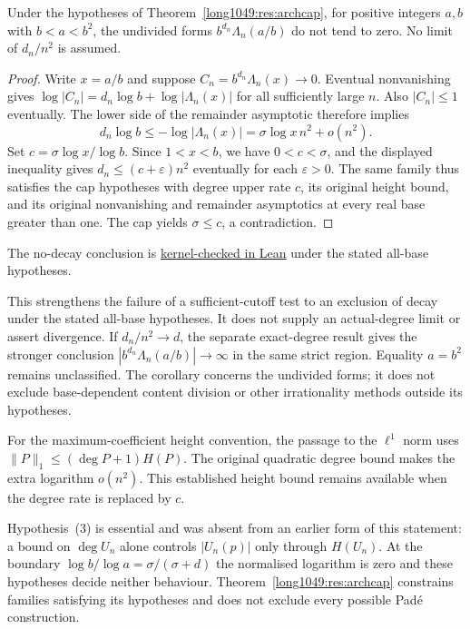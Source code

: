\begin{corollary}
\label{long1049:cor:no-decay-below-square}
Under the hypotheses of Theorem~\ref{long1049:res:archcap}, for positive integers
$a,b$ with $b<a<b^2$, the undivided forms $b^{d_n}\Lambda_n(a/b)$ do not
tend to zero.  No limit of $d_n/n^2$ is assumed.
\end{corollary}
\begin{proof}
Write $x=a/b$ and suppose $C_n=b^{d_n}\Lambda_n(x)\to0$.
Eventual nonvanishing gives
$\log|C_n|=d_n\log b+\log|\Lambda_n(x)|$ for all sufficiently large $n$.
Also $|C_n|\le1$ eventually.  The lower side of the remainder asymptotic
therefore implies
\[
 d_n\log b\le-\log|\Lambda_n(x)|
       =\sigma\log x\,n^2+o(n^2).
\]
Set $c=\sigma\log x/\log b$.  Since $1<x<b$, we have $0<c<\sigma$,
and the displayed inequality gives $d_n\le(c+\varepsilon)n^2$ eventually
for each $\varepsilon>0$.  The same family thus satisfies the cap hypotheses
with degree upper rate $c$, its original height bound, and its original
nonvanishing and remainder asymptotics at every real base greater than one.
The cap yields $\sigma\le c$, a contradiction.
\end{proof}
\noindent The no-decay conclusion is \href{https://github.com/wcook04/plectis-erdos/blob/3be82b1a7340284aea72e9a5c8493cb020843921/ErdosProblems/Erdos1049/PaperNoDecayR9.lean#L69}{kernel-checked in Lean} under the stated all-base hypotheses.


This strengthens the failure of a sufficient-cutoff test to an exclusion
of decay under the stated all-base hypotheses.  It does not supply an
actual-degree limit or assert divergence.  If $d_n/n^2\to d$, the separate
exact-degree result gives the stronger conclusion
$|b^{d_n}\Lambda_n(a/b)|\to\infty$ in the same strict region.
Equality $a=b^2$ remains unclassified.  The corollary concerns the undivided
forms; it does not exclude base-dependent content division or other
irrationality methods outside its hypotheses.

For the maximum-coefficient height convention, the passage to the
$\ell^1$ norm uses $\|P\|_1\le(\deg P+1)H(P)$.  The original quadratic
degree bound makes the extra logarithm $o(n^2)$.  This established height
bound remains available when the degree rate is replaced by $c$.



\noindent Hypothesis~(3) is essential and was absent from an earlier form of
this statement: a bound on $\deg U_n$ alone controls $|U_n(p)|$ only through
$H(U_n)$.  At the boundary $\log b/\log a=\sigma/(\sigma+d)$ the normalised
logarithm is zero and these hypotheses decide neither behaviour.
Theorem~\ref{long1049:res:archcap} constrains families satisfying its hypotheses and
does not exclude every possible Pad\'e construction.

